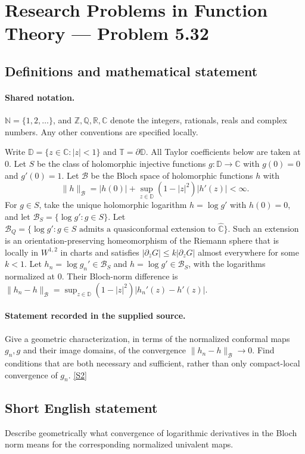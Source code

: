 \documentclass[11pt]{article}
\newcommand{\sref}[2]{\hyperlink{source:#1:#2}{[S#2]}}
\begin{document}
\section{Research Problems in Function Theory — Problem 5.32}\label{statement}

\subsection{Definitions and mathematical statement}

\paragraph{Shared notation.}$\mathbb N=\{1,2,\ldots\}$, and $\mathbb Z,\mathbb Q,\mathbb R,\mathbb C$ denote the integers, rationals, reals and complex numbers. Any other conventions are specified locally.


Write $\mathbb D=\{z\in\mathbb C:|z|<1\}$ and $\mathbb T=\partial\mathbb D$. All Taylor coefficients below are taken at $0$. Let $S$ be the class of holomorphic injective functions $g:\mathbb D\to\mathbb C$ with $g(0)=0$ and $g'(0)=1$. Let $\mathcal B$ be the Bloch space of holomorphic functions $h$ with
\[\|h\|_{\mathcal B}=|h(0)|+\sup_{z\in\mathbb D}(1-|z|^2)|h'(z)|<\infty.
\]
For $g\in S$, take the unique holomorphic logarithm $h=\log g'$ with $h(0)=0$, and let $\mathcal B_S=\{\log g':g\in S\}$. Let $\mathcal B_Q=\{\log g':g\in S\text{ admits a quasiconformal extension to }\widehat{\mathbb C}\}$. Such an extension is an orientation-preserving homeomorphism of the Riemann sphere that is locally in $W^{1,2}$ in charts and satisfies $|\partial_{\bar z}G|\le k|\partial_zG|$ almost everywhere for some $k<1$. Let $h_n=\log g_n'\in\mathcal B_S$ and $h=\log g'\in\mathcal B_S$, with the logarithms normalized at $0$. Their Bloch-norm difference is $\|h_n-h\|_{\mathcal B}=\sup_{z\in\mathbb D}(1-|z|^2)|h_n'(z)-h'(z)|$.
\paragraph{Statement recorded in the supplied source.}
Give a geometric characterization, in terms of the normalized conformal maps $g_n,g$ and their image domains, of the convergence $\|h_n-h\|_{\mathcal B}\to0$. Find conditions that are both necessary and sufficient, rather than only compact-local convergence of $g_n$. \sref{statement}{2}
\subsection{Short English statement}
Describe geometrically what convergence of logarithmic derivatives in the Bloch norm means for the corresponding normalized univalent maps.
\end{document}
